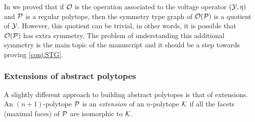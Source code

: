 \documentclass[a4paper,12pt,english]{article}
\begin{document}

In \cite[Thm 5.1]{HubaMocMon2023_VoltageOperationsManiplexes} we proved that if $\mathcal{O}$ is the operation associated to the voltage operator $(\mathcal{Y},\eta)$ and $\mathcal{P}$ is a regular polytope, then the symmetry type graph of $\mathcal{O}(\mathcal{P})$ is a quotient of $\mathcal{Y}$.
However, this quotient can be trivial, in other words, it is possible that $\mathcal{O}(\mathcal{P})$ has extra symmetry.
The problem of understanding this additional symmetry is the main topic of the manuscript \cite{HubaMocMon_SymmetriesVoltageOperations_preprint} and it should be a step towards proving \cref{conj:STG}.

\subsubsection*{Extensions of abstract polytopes} 
A slightly different approach to building abstract polytopes is that of extensions. 
An $(n+1)$-polytope $\mathcal{P}$ is an \emph{extension} of an $n$-polytope $\mathcal{K}$ if all the facets (maximal faces) of $\mathcal{P}$ are isomorphic to $\mathcal{K}$.
\end{document}
